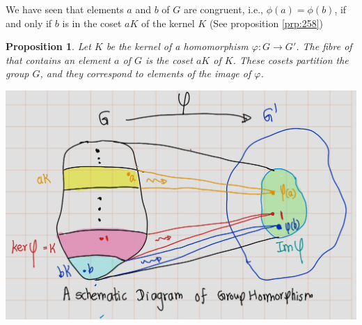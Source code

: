 \documentclass[
]{book}
\newtheorem{proposition}{Proposition}[chapter]
\theoremstyle{definition}
\theoremstyle{definition}
\theoremstyle{definition}
\theoremstyle{definition}
\theoremstyle{remark}
\begin{document}
We have seen that elements \(a\) and \(b\) of \(G\) are congruent, i.e., \(\phi(a) = \phi(b)\), if and only if \(b\) is
in the coset \(a K\) of the kernel \(K\) (See proposition \ref{prp:258})

\begin{proposition}
\protect\hypertarget{prp:unnamed-chunk-32}{}\label{prp:unnamed-chunk-32}Let \(K\) be the kernel of a homomorphism \(\varphi: G \to G'\). The fibre of that contains an element \(a\) of \(G\) is the coset \(a K\) of \(K\). These cosets partition the group \(G\), and they correspond to elements of the image of \(\varphi\).
\end{proposition}

\includegraphics{figures/ch_2/fig35.png}
\end{document}

